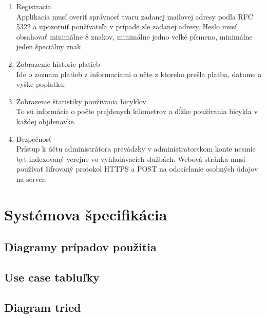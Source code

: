 \documentclass[12pt]{report}
\begin{document}
\begin{enumerate}
    \item Registracia \\
	      Applikacia musí overiť správnosť tvaru zadanej mailovej adresy podľa RFC 5322 
        a upozorniť používateľa v prípade zle zadanej adresy. Heslo musí obsahovať minimálne 8 
        znakov, minimálne jedno veľké písmeno, minimálne jeden špeciálny znak.

    \item Zobrazenie historie platieb\\
        Ide o zoznam platieb z informaciami o učte z ktoreho prešla platba, datume a vyške poplatku.
    \item Zobrazenie štatistiky použivania bicyklov\\
        To sú informácie o počte prejdenych kilometrov a dĺžke používania bicykla v každej objdenavke.
    \item Bezpečnosť\\
        Prístup k účtu administrátora prevádzky v administratorskom konte nesmie byť indexovaný verejne vo
        vyhľadávacích službách. Webová stránka musí používať šifrovaný protokol HTTPS a POST na odosielanie osobných 
        údajov na server.
\end{enumerate}

\chapter{Systémova špecifikácia}
\section{Diagramy prípadov použitia}


\section{Use case tabluľky}
\section{Diagram tried}

\end{document}
